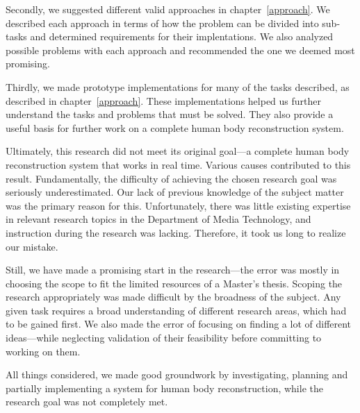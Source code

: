 Secondly, we suggested different valid approaches in chapter~\ref{approach}. We described each approach in terms of how the problem can be divided into sub-tasks and determined requirements for their implentations. We also analyzed possible problems with each approach and recommended the one we deemed most promising.

Thirdly, we made prototype implementations for many of the tasks described, as described in chapter~\ref{approach}. These implementations helped us further understand the tasks and problems that must be solved. They also provide a useful basis for further work on a complete human body reconstruction system.

\newtopic

Ultimately, this research did not meet its original goal---a complete human body reconstruction system that works in real time. Various causes contributed to this result. Fundamentally, the difficulty of achieving the chosen research goal was seriously underestimated. Our lack of previous knowledge of the subject matter was the primary reason for this. Unfortunately, there was little existing expertise in relevant research topics in the Department of Media Technology, and instruction during the research was lacking. Therefore, it took us long to realize our mistake.

Still, we have made a promising start in the research---the error was mostly in choosing the scope to fit the limited resources of a Master's thesis. Scoping the research appropriately was made difficult by the broadness of the subject. Any given task requires a broad understanding of different research areas, which had to be gained first. We also made the error of focusing on finding a lot of different ideas---while neglecting validation of their feasibility before committing to working on them.

All things considered, we made good groundwork by investigating, planning and partially implementing a system for human body reconstruction, while the research goal was not completely met.
